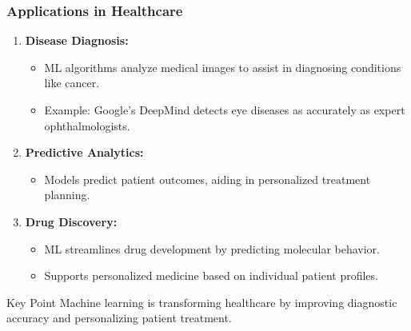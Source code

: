 \documentclass[aspectratio=169]{beamer}
\begin{document}
\begin{frame}[fragile]
    \frametitle{Applications in Healthcare}
    \begin{enumerate}
        \item \textbf{Disease Diagnosis:}
            \begin{itemize}
                \item ML algorithms analyze medical images to assist in diagnosing conditions like cancer.
                \item Example: Google’s DeepMind detects eye diseases as accurately as expert ophthalmologists.
            \end{itemize}
        \item \textbf{Predictive Analytics:}
            \begin{itemize}
                \item Models predict patient outcomes, aiding in personalized treatment planning.
            \end{itemize}
        \item \textbf{Drug Discovery:}
            \begin{itemize}
                \item ML streamlines drug development by predicting molecular behavior.
                \item Supports personalized medicine based on individual patient profiles.
            \end{itemize}
    \end{enumerate}
    \begin{block}{Key Point}
        Machine learning is transforming healthcare by improving diagnostic accuracy and personalizing patient treatment.
    \end{block}
\end{frame}
\end{document}
